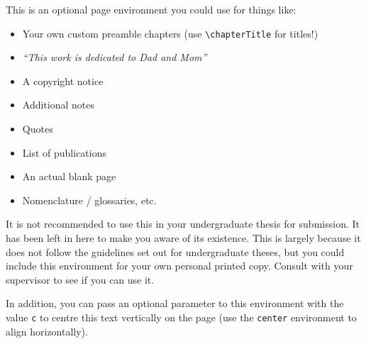 
\begin{blankpage}
    This is an optional page environment you could use for things like:
	\begin{itemize}
		\item Your own custom preamble chapters (use \texttt{\textbackslash chapterTitle} for titles!)
		\item \emph{``This work is dedicated to Dad and Mom''}
		\item A copyright notice
		\item Additional notes
		\item Quotes
		\item List of publications
		\item An actual blank page
		\item Nomenclature / glossaries, etc.
	\end{itemize}
	It is not recommended to use this in your undergraduate thesis for submission. It has been left in here to make you aware of its existence. This is largely because it does not follow the guidelines set out for undergraduate theses, but you could include this environment for your own personal printed copy. Consult with your supervisor to see if you can use it. 
	
	In addition, you can pass an optional parameter to this environment with the value \texttt{c} to centre this text vertically on the page (use the \texttt{center} environment to align horizontally).
\end{blankpage}
